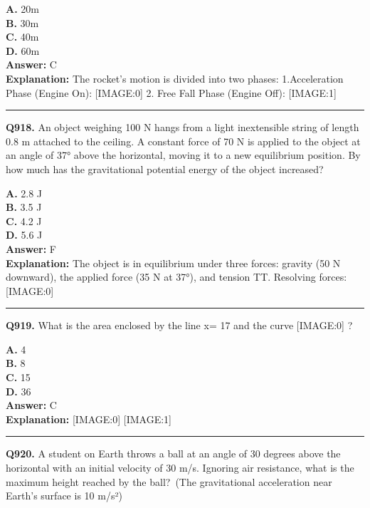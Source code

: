 \documentclass[12pt]{article}
\begin{document}
\textbf{A.} 20m \\
\textbf{B.} 30m \\
\textbf{C.} 40m \\
\textbf{D.} 60m \\

\textbf{Answer:} C \\
\textbf{Explanation:} The rocket's motion is divided into two phases:
1.Acceleration Phase (Engine On):
[IMAGE:0]
2. Free Fall Phase (Engine Off):
[IMAGE:1]

\hrule
\vspace{1em}


\noindent
\textbf{Q918.} An object weighing 100 N hangs from a light inextensible string of length 0.8 m attached to the ceiling. A constant force of 70 N is applied to the object at an angle of 37° above the horizontal, moving it to a new equilibrium position. By how much has the gravitational potential energy of the object increased?



\textbf{A.} 2.8 J \\
\textbf{B.} 3.5 J \\
\textbf{C.} 4.2 J \\
\textbf{D.} 5.6 J \\

\textbf{Answer:} F \\
\textbf{Explanation:} The object is in equilibrium under three forces: gravity (50 N downward), the applied force (35 N at 37°), and tension TT. Resolving forces:
[IMAGE:0]

\hrule
\vspace{1em}


\noindent
\textbf{Q919.} What is the area enclosed by the line x=
17
and the curve
[IMAGE:0]
?



\textbf{A.} 4 \\
\textbf{B.} 8 \\
\textbf{C.} 15 \\
\textbf{D.} 36 \\

\textbf{Answer:} C \\
\textbf{Explanation:} [IMAGE:0]
[IMAGE:1]

\hrule
\vspace{1em}


\noindent
\textbf{Q920.} A student on Earth throws a ball at an angle of 30 degrees above the horizontal with an initial velocity of 30 m/s. Ignoring air resistance, what is the maximum height reached by the ball? (The gravitational acceleration near Earth's surface is 10 m/s²)
\end{document}
